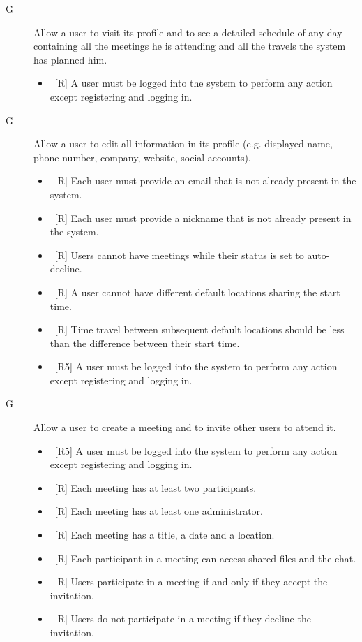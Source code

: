\begin{description}
\item[G\thecountGoal] Allow a user to visit its profile and to see a detailed schedule of any day containing all the meetings he is attending and all the travels the system has planned him.

\begin{itemize}
\item~[R\reqNum] A user must be logged into the system to perform any action except registering and logging in.
\end{itemize}


\item[G\thecountGoal] Allow a user to edit all information in its profile (e.g. displayed name, phone number, company, website, social accounts).

\begin{itemize}
\item~[R\reqNum] Each user must provide an email that is not already present in the system.
\item~[R\reqNum] Each user must provide a nickname that is not already present in the system.
\item~[R\reqNum] Users cannot have meetings while their status is set to auto-decline.
\item~[R\reqNum] A user cannot have different default locations sharing the start time.
\item~[R\reqNum] Time travel between subsequent default locations should be less than the difference between their start time.
\item~[R5] A user must be logged into the system to perform any action except registering and logging in.
\end{itemize}

\item[G\thecountGoal] Allow a user to create a meeting and to invite other users to attend it.

\begin{itemize}
\item~[R5] A user must be logged into the system to perform any action except registering and logging in.
\item~[R\reqNum] Each meeting has at least two participants.
\item~[R\reqNum] Each meeting has at least one administrator.
\item~[R\reqNum] Each meeting has a title, a date and a location.
\item~[R\reqNum] Each participant in a meeting can access shared files and the chat.
\item~[R\reqNum] Users participate in a meeting if and only if they accept the invitation.
\item~[R\reqNum] Users do not participate in a meeting if they decline the invitation.
\end{itemize}


\end{description}
